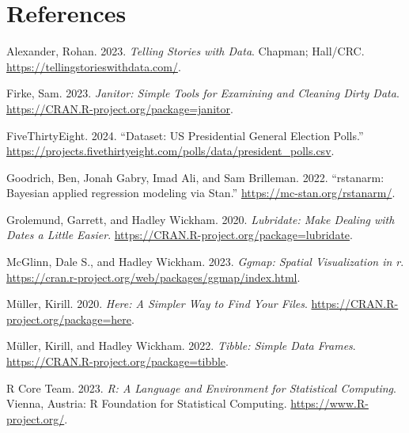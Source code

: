 \documentclass[
  letterpaper,
  DIV=11,
  numbers=noendperiod]{scrartcl}
\newlength{\cslhangindent}
\newlength{\cslentryspacingunit} %
\newenvironment{CSLReferences}[2] %
 {%
  \setlength{\parindent}{0pt}
  \ifodd #1
  \let\oldpar\par
  \def\par{\hangindent=\cslhangindent\oldpar}
  \fi
  \setlength{\parskip}{#2\cslentryspacingunit}
 }%
 {}
\begin{document}
\newpage

\hypertarget{references}{%
\section*{References}\label{references}}

\hypertarget{refs}{}
\begin{CSLReferences}{1}{0}
\leavevmode{}%
Alexander, Rohan. 2023. \emph{Telling Stories with Data}. Chapman;
Hall/CRC. \url{https://tellingstorieswithdata.com/}.

\leavevmode{}%
Firke, Sam. 2023. \emph{Janitor: Simple Tools for Examining and Cleaning
Dirty Data}. \url{https://CRAN.R-project.org/package=janitor}.

\leavevmode{}%
FiveThirtyEight. 2024. {``Dataset: US Presidential General Election
Polls.''}
\url{https://projects.fivethirtyeight.com/polls/data/president_polls.csv}.

\leavevmode{}%
Goodrich, Ben, Jonah Gabry, Imad Ali, and Sam Brilleman. 2022.
{``{rstanarm: {Bayesian} applied regression modeling via {Stan}}.''}
\url{https://mc-stan.org/rstanarm/}.

\leavevmode{}%
Grolemund, Garrett, and Hadley Wickham. 2020. \emph{Lubridate: Make
Dealing with Dates a Little Easier}.
\url{https://CRAN.R-project.org/package=lubridate}.

\leavevmode{}%
McGlinn, Dale S., and Hadley Wickham. 2023. \emph{Ggmap: Spatial
Visualization in r}.
\url{https://cran.r-project.org/web/packages/ggmap/index.html}.

\leavevmode{}%
Müller, Kirill. 2020. \emph{Here: A Simpler Way to Find Your Files}.
\url{https://CRAN.R-project.org/package=here}.

\leavevmode{}%
Müller, Kirill, and Hadley Wickham. 2022. \emph{Tibble: Simple Data
Frames}. \url{https://CRAN.R-project.org/package=tibble}.

\leavevmode{}%
R Core Team. 2023. \emph{{R: A Language and Environment for Statistical
Computing}}. Vienna, Austria: R Foundation for Statistical Computing.
\url{https://www.R-project.org/}.


\end{CSLReferences}
\end{document}
